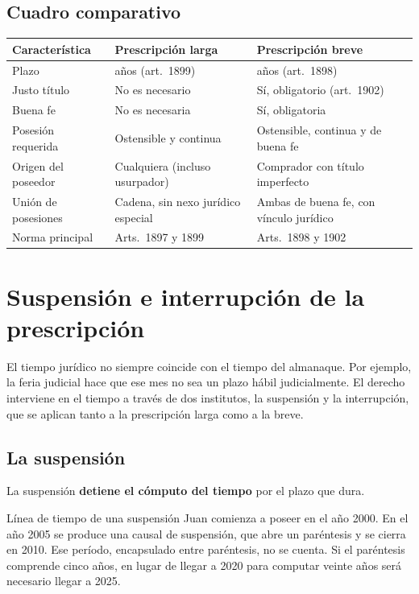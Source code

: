 \documentclass[12pt,oneside]{book}
\begin{document}
\subsection{Cuadro comparativo}

\begin{table}[H]
\centering
\begin{tabularx}{\textwidth}{@{}>{\raggedright\arraybackslash}p{}>{\raggedright\arraybackslash}X>{\raggedright\arraybackslash}X@{}}
\toprule
\textbf{Característica} & \textbf{Prescripción larga} & \textbf{Prescripción breve} \\
\midrule
Plazo & 20 años (art.~1899) & 10 años (art.~1898) \\
Justo título & No es necesario & Sí, obligatorio (art.~1902) \\
Buena fe & No es necesaria & Sí, obligatoria \\
Posesión requerida & Ostensible y continua & Ostensible, continua y de buena fe \\
Origen del poseedor & Cualquiera (incluso usurpador) & Comprador con título imperfecto \\
Unión de posesiones & Cadena, sin nexo jurídico especial & Ambas de buena fe, con vínculo jurídico \\
Norma principal & Arts.~1897 y 1899 & Arts.~1898 y 1902 \\
\bottomrule
\end{tabularx}
\end{table}

\section{Suspensión e interrupción de la prescripción}

El tiempo jurídico no siempre coincide con el tiempo del almanaque. Por ejemplo, la feria judicial hace que ese mes no sea un plazo hábil judicialmente. El derecho interviene en el tiempo a través de dos institutos, la suspensión y la interrupción, que se aplican tanto a la prescripción larga como a la breve.

\subsection{La suspensión}

La suspensión \textbf{detiene el cómputo del tiempo} por el plazo que dura.

\begin{example}{Línea de tiempo de una suspensión}
Juan comienza a poseer en el año 2000. En el año 2005 se produce una causal de suspensión, que abre un paréntesis y se cierra en 2010. Ese período, encapsulado entre paréntesis, no se cuenta. Si el paréntesis comprende cinco años, en lugar de llegar a 2020 para computar veinte años será necesario llegar a 2025.
\end{example}
\end{document}
